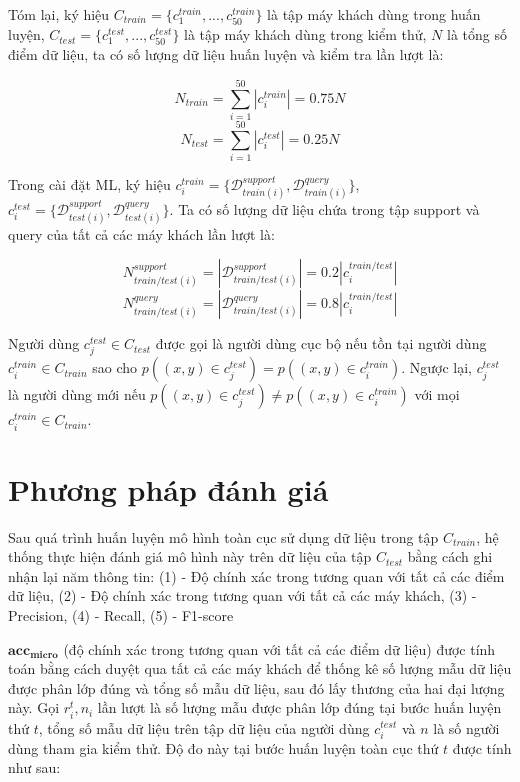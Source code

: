 Tóm lại, ký hiệu $C_{train} = \{c^{train}_1,...,c^{train}_{50}\}$ là tập máy khách dùng trong huấn luyện, $C_{test} = \{c^{test}_1,...,c^{test}_{50}\}$ là tập máy khách dùng trong kiểm thử, $N$ là tổng số điểm dữ liệu, ta có số lượng dữ liệu huấn luyện và kiểm tra lần lượt là:

\begin{equation*}
    N_{train} = \sum_{i=1}^{50} \left|c^{train}_i\right| = 0.75N
\end{equation*}
\begin{equation*}
    N_{test} = \sum_{i=1}^{50} \left|c^{test}_i\right| = 0.25N
\end{equation*}

Trong cài đặt ML, ký hiệu $c^{train}_i = \{\mathcal{D}_{train(i)}^{support}, \mathcal{D}_{train(i)}^{query}\}$, $ c^{test}_i = \{\mathcal{D}_{test(i)}^{support}, \mathcal{D}_{test(i)}^{query}\}$. Ta có số lượng dữ liệu chứa trong tập support và query của tất cả các máy khách lần lượt là:

\begin{equation*}
    N_{train/test(i)}^{support} = \left|\mathcal{D}_{train/test(i)}^{support}\right| = 0.2 \left|c_i^{train/test}\right|
\end{equation*}
\begin{equation*}
    N_{train/test(i)}^{query} = \left|\mathcal{D}_{train/test(i)}^{query}\right| = 0.8 \left|c^{train/test}_i\right|
\end{equation*}

Người dùng $c_j^{test} \in C_{test}$ được gọi là người dùng cục bộ nếu tồn tại người dùng $c_i^{train}\in C_{train}$ sao cho $p\left((x,y)\in c_j^{test}\right) = p\left((x,y)\in c_i^{train}\right)$. Ngược lại, $c_j^{test}$ là người dùng mới nếu $p\left((x,y)\in c_j^{test}\right) \ne p\left((x,y)\in c_i^{train}\right)$ với mọi $c_i^{train}\in C_{train}$.

\section{Phương pháp đánh giá}

Sau quá trình huấn luyện mô hình toàn cục sử dụng dữ liệu trong tập $C_{train}$, hệ thống thực hiện đánh giá mô hình này trên dữ liệu của tập $C_{test}$ bằng cách ghi nhận lại năm thông tin: (1) - Độ chính xác trong tương quan với tất cả các điểm dữ liệu, (2) - Độ chính xác trong tương quan với tất cả các máy khách, (3) - Precision, (4) - Recall, (5) - F1-score

$\mathbf{acc_{micro}}$ (độ chính xác trong tương quan với tất cả các điểm dữ liệu) được tính toán bằng cách duyệt qua tất cả các máy khách để thống kê số lượng mẫu dữ liệu được phân lớp đúng và tổng số mẫu dữ liệu, sau đó lấy thương của hai đại lượng này. Gọi $r_i^t, n_i$ lần lượt là số lượng mẫu được phân lớp đúng tại bước huấn luyện thứ $t$, tổng số mẫu dữ liệu trên tập dữ liệu của người dùng $c_i^{test}$ và $n$ là số người dùng tham gia kiểm thử. Độ đo này tại bước huấn luyện toàn cục thứ $t$ được tính như sau:

